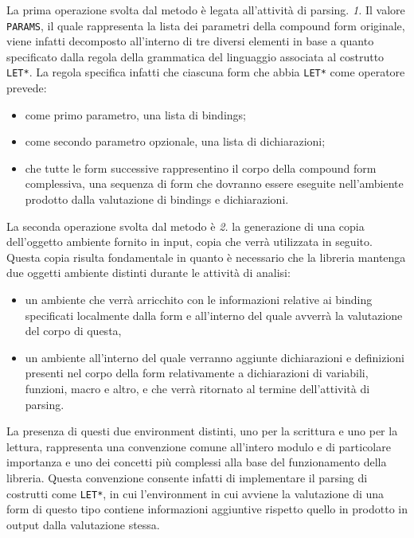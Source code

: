 La prima operazione svolta dal metodo è legata all'attività di parsing.
\textit{1.} Il valore \texttt{PARAMS}, il quale rappresenta la lista dei
parametri della compound form originale, viene infatti decomposto all’interno di
tre diversi elementi in base a quanto specificato dalla regola della grammatica
del linguaggio associata al costrutto \texttt{LET*}. La regola specifica infatti
che ciascuna form che abbia \texttt{LET*} come operatore prevede:

\begin{itemize}

\item come primo parametro, una lista di bindings;

\item come secondo parametro opzionale, una lista di dichiarazioni;

\item che tutte le form successive rappresentino il corpo della compound form
complessiva, una sequenza di form che dovranno essere eseguite nell’ambiente
prodotto dalla valutazione di bindings e dichiarazioni.

\end{itemize}

La seconda operazione svolta dal metodo è \textit{2.} la generazione di una
copia dell’oggetto ambiente fornito in input, copia che verrà utilizzata in
seguito. Questa copia risulta fondamentale in quanto è necessario che la
libreria mantenga due oggetti ambiente distinti durante le attività di analisi:

\begin{itemize}

\item un ambiente che verrà arricchito con le informazioni relative ai binding
specificati localmente dalla form e all'interno del quale avverrà la valutazione
del corpo di questa,

\item un ambiente all'interno del quale verranno aggiunte dichiarazioni e
definizioni presenti nel corpo della form relativamente a dichiarazioni di
variabili, funzioni, macro e altro, e che verrà ritornato al termine
dell'attività di parsing.

\end{itemize}

La presenza di questi due environment distinti, uno per la scrittura e uno per
la lettura, rappresenta una convenzione comune all’intero modulo e di
particolare importanza e uno dei concetti più complessi alla base del
funzionamento della libreria. Questa convenzione consente infatti di
implementare il parsing di costrutti come \texttt{LET*}, in cui l’environment in
cui avviene la valutazione di una form di questo tipo contiene informazioni
aggiuntive rispetto quello in prodotto in output dalla valutazione stessa.\\

